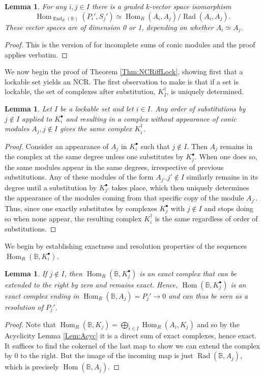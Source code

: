 \documentclass[reqno, 12pt]{amsart}
\newtheorem{lemma}[theorem]{Lemma}
\theoremstyle{definition}
\numberwithin{equation}{section}
\newcommand{\Hom}{\operatorname{Hom}}
\newcommand{\End}{\operatorname{End}}
\begin{document}
\begin{lemma}
    \label{Lem:vspIso}
    For any $i,j\in I$ there is a graded $k$-vector space isomorphism\[
    \Hom_{\End_R(\mathbb{B})}(P_i',S_j')\simeq \Hom_R(A_i,A_j)/\operatorname{Rad}(A_i,A_j).
    \]
    These vector spaces are of dimension 0 or 1, depending on whether $A_i\simeq A_j$.
\end{lemma}
\begin{proof}
    This is the version of \cite[Lemma 6.7]{FMS19} for incomplete sums of conic modules and the proof applies verbatim.
\end{proof}

We now begin the proof of Theorem \ref{Thm:NCRiffLock}, showing first that a lockable set yields an NCR. The first observation to make is that if a set is lockable, the set of complexes after substitution, $K_I^\dagger$, is uniquely determined.

\begin{lemma}
\label{Lem:SubstitutionIsUnique}
    Let $I$ be a lockable set and let $i\in I$. Any order of substitutions by $j\not\in I$ applied to $K_i^\bullet$ and resulting in a complex without appearance of conic modules $A_j, j\not\in I$ gives the same complex $K_i^\dagger$.
\end{lemma}
\begin{proof}
Consider an appearance of $A_j$ in $K_i^\bullet$ such that $j\not\in I$. Then $A_j$ remains in the complex at the same degree unless one substitutes by $K_j^\bullet$. When one does so, the same modules appear in the same degrees, irrespective of previous substitutions. Any of these modules of the form $A_{j'}. j'\not\in I$ similarly remains in its degree until a substitution by $K_{j'}^\bullet$ takes place, which then uniquely determines the appearance of the modules coming from that specific copy of the module $A_{j'}$. Thus, since one exactly substitutes by complexes $K_j^\bullet$ with $j\not\in I$ and stops doing so when none appear, the resulting complex $K_i^\dagger$ is the same regardless of order of substitutions.
\end{proof}

We begin by establishing exactness and resolution properties of the sequences $\Hom_R(\mathbb{B},K_i^\bullet)$.

\begin{lemma}
\label{Lem:Extend by 0 if not in set}
    If $j\not\in I$, then $\Hom_R(\mathbb{B},K_j^\bullet)$ is an exact complex that can be extended to the right by zero and remains exact. Hence, $\Hom(\mathbb{B},K_j^\bullet)$ is an exact complex ending in $\Hom_R(\mathbb{B},A_j)=P_j'\rightarrow 0$ and can thus be seen as a resolution of $P_j'$.
\end{lemma}
\begin{proof}
    Note that $\Hom_R(\mathbb{B},K_j)=\bigoplus_{i\in I}\Hom_R(A_i,K_j)$ and so by the Acyclicity Lemma \ref{Lem:Acyc} it is a direct sum of exact complexes, hence exact. It suffices to find the cokernel of the last map to show we can extend the complex by 0 to the right. But the image of the incoming map is just $\operatorname{Rad}(\mathbb{B}, A_j)$, which is precisely $\Hom(\mathbb{B},A_j)$.
\end{proof}
\end{document}
